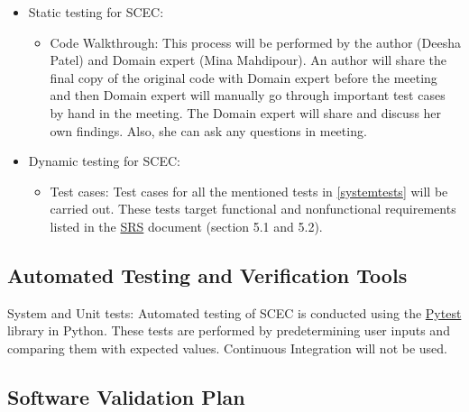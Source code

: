 \documentclass[12pt, titlepage]{article}
\begin{document}
\begin{itemize}

\item Static testing for SCEC:

\begin{itemize}


\item Code Walkthrough: This process will be performed by the author (Deesha Patel) and Domain expert (Mina Mahdipour). An author will share the final copy of the original code with Domain expert before the meeting and then Domain expert will manually go through important test cases by hand in the meeting. The Domain expert will share and discuss her own findings. Also, she can ask any questions in meeting.

\end{itemize}
\end{itemize}

\begin{itemize}

\item Dynamic testing for SCEC:

\begin{itemize}


\item Test cases: Test cases for all the mentioned tests in \autoref{systemtests} will be carried out. These tests target functional and nonfunctional requirements listed in the \href{https://github.com/DeeshaPatel/CAS-741-Solar-Cooker/blob/7c53c8d9a19ca2f94dfba6ba9208eae0bf03b8cc/docs/SRS/SRS.pdf}{SRS} document (section 5.1 and 5.2). 

\end{itemize}
\end{itemize}



\subsection{Automated Testing and Verification Tools}
\label{automated_testing_verification_tools}

System and Unit tests: Automated testing of SCEC is conducted using the \href{https://docs.pytest.org/en/7.2.x/}{Pytest} library in Python. These tests are performed by predetermining user inputs and comparing them with expected values. Continuous Integration will not be used.  

\subsection{Software Validation Plan}
\label{software_validation_plan}
\end{document}
